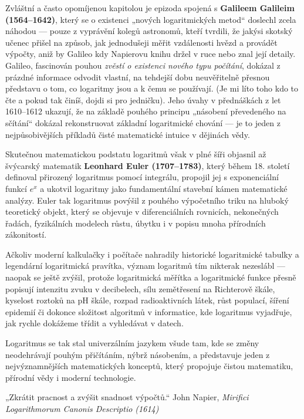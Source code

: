 \documentclass[12pt,a4paper]{article}
\begin{document}
\begin{historicalbox}
Zvláštní a často opomíjenou kapitolou je epizoda spojená s \textbf{Galileem Galileim (1564–1642)}, 
který se o existenci „nových logaritmických metod“ doslechl zcela náhodou — 
pouze z vyprávění kolegů astronomů, kteří tvrdili, že jakýsi skotský učenec přišel na způsob, 
jak jednodušeji měřit vzdálenosti hvězd a provádět výpočty, 
aniž by Galileo kdy Napierovu knihu držel v ruce nebo znal její detaily. 
Galileo, fascinován pouhou \emph{zvěstí o existenci nového typu počítání}, 
dokázal z prázdné informace odvodit vlastní, na tehdejší dobu neuvěřitelně přesnou představu 
o tom, co logaritmy jsou a k čemu se používají. (Je mi líto toho kdo to čte a pokud tak činíš, dojdi si pro jedničku).
Jeho úvahy v přednáškách z let 1610–1612 ukazují, že na základě pouhého principu 
„násobení převedeného na sčítání“ dokázal rekonstruovat základní logaritmické chování — 
je to jeden z nejpůsobivějších příkladů čisté matematické intuice v dějinách vědy.  

Skutečnou matematickou podstatu logaritmů však v plné šíři objasnil až 
švýcarský matematik \textbf{Leonhard Euler (1707–1783)}, 
který během 18. století definoval přirozený logaritmus pomocí integrálu, 
propojil jej s exponenciální funkcí $e^x$ 
a ukotvil logaritmy jako fundamentální stavební kámen matematické analýzy. 
Euler tak logaritmus povýšil z pouhého výpočetního triku 
na hluboký teoretický objekt, který se objevuje v diferenciálních rovnicích, 
nekonečných řadách, fyzikálních modelech růstu, úbytku i v popisu mnoha přírodních zákonitostí.  

Ačkoliv moderní kalkulačky i počítače nahradily historické logaritmické tabulky 
a legendární logaritmická pravítka, význam logaritmů tím nikterak nezeslábl — 
naopak se ještě zvýšil, protože logaritmická měřítka a logaritmické funkce 
přesně popisují intenzitu zvuku v decibelech, sílu zemětřesení na Richterově škále, 
kyselost roztoků na pH škále, rozpad radioaktivních látek, růst populací, 
šíření epidemií či dokonce složitost algoritmů v informatice, 
kde logaritmus vyjadřuje, jak rychle dokážeme třídit a vyhledávat v datech.  

Logaritmus se tak stal univerzálním jazykem všude tam, 
kde se změny neodehrávají pouhým přičítáním, nýbrž násobením, 
a představuje jeden z nejvýznamnějších matematických konceptů, 
který propojuje čistou matematiku, přírodní vědy i moderní technologie.
\end{historicalbox}

\begin{quotebox}
{„Zkrátit pracnost a zvýšit snadnost výpočtů.“}
{John Napier, \textit{Mirifici Logarithmorum Canonis Descriptio (1614)}}
\end{quotebox}
\end{document}

